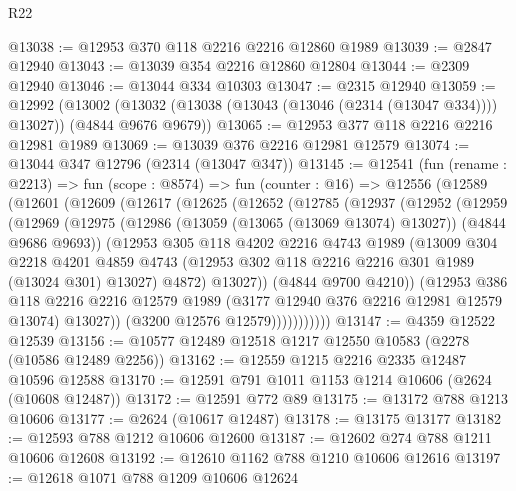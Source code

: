 \begin{lexlean}{R22}
\begin{coremodule}
@13038 := @12953 @370 @118 @2216 @2216 @12860 @1989
@13039 := @2847 @12940
@13043 := @13039 @354 @2216 @12860 @12804
@13044 := @2309 @12940
@13046 := @13044 @334 @10303
@13047 := @2315 @12940
@13059 := @12992
    (@13002 (@13032 (@13038 (@13043 (@13046 (@2314 (@13047 @334)))) @13027)) (@4844 @9676 @9679))
@13065 := @12953 @377 @118 @2216 @2216 @12981 @1989
@13069 := @13039 @376 @2216 @12981 @12579
@13074 := @13044 @347 @12796 (@2314 (@13047 @347))
@13145 := @12541
    (fun (rename : @2213) =>
    fun (scope : @8574) =>
    fun (counter : @16) =>
    @12556
      (@12589
        (@12601
          (@12609
            (@12617
              (@12625
                (@12652
                  (@12785
                    (@12937
                      (@12952
                        (@12959
                          (@12969
                            (@12975
                              (@12986 (@13059 (@13065 (@13069 @13074) @13027)) (@4844 @9686 @9693))
                              (@12953
                                @305
                                @118
                                @4202
                                @2216
                                @4743
                                @1989
                                (@13009
                                  @304
                                  @2218
                                  @4201
                                  @4859
                                  @4743
                                  (@12953 @302 @118 @2216 @2216 @301 @1989 (@13024 @301) @13027)
                                  @4872)
                                @13027))
                            (@4844 @9700 @4210))
                          (@12953
                            @386
                            @118
                            @2216
                            @2216
                            @12579
                            @1989
                            (@3177 @12940 @376 @2216 @12981 @12579 @13074)
                            @13027))
                        (@3200 @12576 @12579)))))))))))
@13147 := @4359 @12522 @12539
@13156 := @10577 @12489 @12518 @1217 @12550 @10583 (@2278 (@10586 @12489 @2256))
@13162 := @12559 @1215 @2216 @2335 @12487 @10596 @12588
@13170 := @12591 @791 @1011 @1153 @1214 @10606 (@2624 (@10608 @12487))
@13172 := @12591 @772 @89
@13175 := @13172 @788 @1213 @10606
@13177 := @2624 (@10617 @12487)
@13178 := @13175 @13177
@13182 := @12593 @788 @1212 @10606 @12600
@13187 := @12602 @274 @788 @1211 @10606 @12608
@13192 := @12610 @1162 @788 @1210 @10606 @12616
@13197 := @12618 @1071 @788 @1209 @10606 @12624

\end{coremodule}
\end{lexlean}
